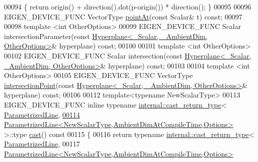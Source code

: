 \begin{DoxyCode}
00094 \textcolor{keyword}{  }\{ \textcolor{keywordflow}{return} origin() + direction().dot(p-origin()) * direction(); \}
00095 
00096   EIGEN\_DEVICE\_FUNC VectorType \hyperlink{group___geometry___module_ae0a510cc78156974ab5a7fb8a6b2326a}{pointAt}(\textcolor{keyword}{const} Scalar& t) \textcolor{keyword}{const};
00097   
00098   \textcolor{keyword}{template} <\textcolor{keywordtype}{int} OtherOptions>
00099   EIGEN\_DEVICE\_FUNC Scalar intersectionParameter(\textcolor{keyword}{const} 
      \hyperlink{group___geometry___module_class_eigen_1_1_hyperplane}{Hyperplane<\_Scalar, \_AmbientDim, OtherOptions>}& hyperplane) \textcolor{keyword}{
      const};
00100  
00101   \textcolor{keyword}{template} <\textcolor{keywordtype}{int} OtherOptions>
00102   EIGEN\_DEVICE\_FUNC Scalar intersection(\textcolor{keyword}{const} 
      \hyperlink{group___geometry___module_class_eigen_1_1_hyperplane}{Hyperplane<\_Scalar, \_AmbientDim, OtherOptions>}& hyperplane) \textcolor{keyword}{
      const};
00103   
00104   \textcolor{keyword}{template} <\textcolor{keywordtype}{int} OtherOptions>
00105   EIGEN\_DEVICE\_FUNC VectorType \hyperlink{group___geometry___module_a9319102677fc48d2208c949f448f4829}{intersectionPoint}(\textcolor{keyword}{const} 
      \hyperlink{group___geometry___module_class_eigen_1_1_hyperplane}{Hyperplane<\_Scalar, \_AmbientDim, OtherOptions>}& hyperplane) \textcolor{keyword}{
      const};
00106 
00112   \textcolor{keyword}{template}<\textcolor{keyword}{typename} NewScalarType>
00113   EIGEN\_DEVICE\_FUNC \textcolor{keyword}{inline} \textcolor{keyword}{typename} \hyperlink{struct_eigen_1_1internal_1_1cast__return__type}{internal::cast\_return\_type}<
      \hyperlink{group___geometry___module_a7c23f36d93cf3b3c2b37fd9f9eda5685}{ParametrizedLine},
\hyperlink{group___geometry___module_a2f48ba47cd487a3550b4371f01c3271c}{00114}            \hyperlink{group___geometry___module_class_eigen_1_1_parametrized_line}{ParametrizedLine<NewScalarType,AmbientDimAtCompileTime,Options>}
       >::type \hyperlink{group___geometry___module_a2f48ba47cd487a3550b4371f01c3271c}{cast}()\textcolor{keyword}{ const}
00115 \textcolor{keyword}{  }\{
00116     \textcolor{keywordflow}{return} \textcolor{keyword}{typename} \hyperlink{struct_eigen_1_1internal_1_1cast__return__type}{internal::cast\_return\_type}<
      \hyperlink{group___geometry___module_a7c23f36d93cf3b3c2b37fd9f9eda5685}{ParametrizedLine},
00117                     
      \hyperlink{group___geometry___module_class_eigen_1_1_parametrized_line}{ParametrizedLine<NewScalarType,AmbientDimAtCompileTime,Options>}

\end{DoxyCode}
